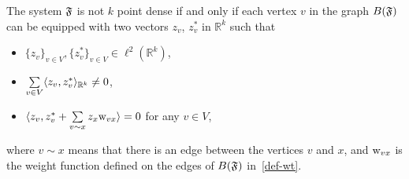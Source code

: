 \documentclass[12pt,oneside,a4paper]{amsart}
\begin{document}
      \begin{corol}
        \label{corol:kpd}
        The system $\mathfrak{F}$ is not $k$ point dense if and only if each vertex $v$ in the graph $B(\mathfrak{F})$ can be
          equipped with two vectors $z_v$, $z_v^*$ in $\mathbb{R}^k$ such that
          \begin{itemize}
            \item $\{z_v\}_{v \in V}, \{z_v^*\}_{v \in V} \in \ell^2(\mathbb{R}^k)$, \\
            \item $\sum\limits_{v\in V} \langle z_v, z_v^* \rangle_{\mathbb{R}^k} \neq 0$, \\
            \item $\langle z_v, z_v^* + \sum\limits_{v \sim x} z_x \mathrm{w}_{vx} \rangle = 0$ for any $v \in V$,
          \end{itemize}
          where $v \sim x$ means that there is an edge between the vertices $v$ and $x$, and
          $\mathrm{w}_{vx}$ is the weight function defined on the edges of $B(\mathfrak{F})$ in~\eqref{def-wt}.
      \end{corol}
\end{document}
